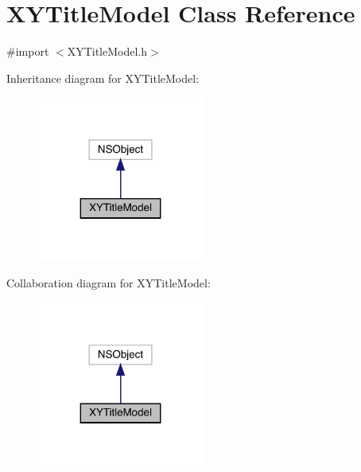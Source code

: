 \hypertarget{interface_x_y_title_model}{}\section{X\+Y\+Title\+Model Class Reference}
\label{interface_x_y_title_model}


{\ttfamily \#import $<$X\+Y\+Title\+Model.\+h$>$}



Inheritance diagram for X\+Y\+Title\+Model\+:\nopagebreak
\begin{figure}[H]
\begin{center}
\leavevmode
\includegraphics[width=155pt]{interface_x_y_title_model__inherit__graph}
\end{center}
\end{figure}


Collaboration diagram for X\+Y\+Title\+Model\+:\nopagebreak
\begin{figure}[H]
\begin{center}
\leavevmode
\includegraphics[width=155pt]{interface_x_y_title_model__coll__graph}
\end{center}
\end{figure}
